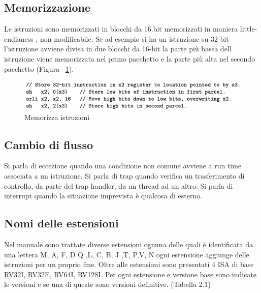 \documentclass[12pt,a4paper]{report}
\begin{document}
\subsection{Memorizzazione} 
Le istruzioni sono memorizzati in blocchi da 16.bit memorizzati in maniera little-endianess , non modificabile. Se ad esempio si ha un istruzione su 32 bit l’istruzione avviene divisa in due blocchi da 16-bit la parte più bassa dell istruzione viene memorizzata nel primo pacchetto e la parte più alta nel secondo pacchetto (Figura~ \ref{fig:memorizza_Istruzioni}). 

\begin{figure}
\includegraphics[width = \textwidth]{SomeLineCodeRISC.png}
\caption{Memorizza istruzioni} 
\label{fig:memorizza_Istruzioni} 
\end{figure}

\subsection{Cambio di flusso}
Si parla di eccezione quando una condizione non comune avviene a run time associata a un istruzione.
Si parla di trap quando verifica un trasferimento di controllo, da parte del trap handler, da un thread ad un altro. Si parla di interrupt quando la situazione imprevista è qualcosa di esterno.


\subsection{Nomi delle estensioni}
Nel manuale sono trattate diverse estensioni ognuna delle quali è identificata da una lettera 
M, A, F, D Q ,L, C, B, J ,T, P,V, N ogni estensione aggiunge delle istruzioni per un proprio fine. Oltre alle estensioni sono presentati 4 ISA di base RV32I, RV32E, RV64I, RV128I. Per ogni estensione e versione base sono indicate le versioni e se una di queste sono versioni definitive.
(Tabella 2.1)
\end{document}
